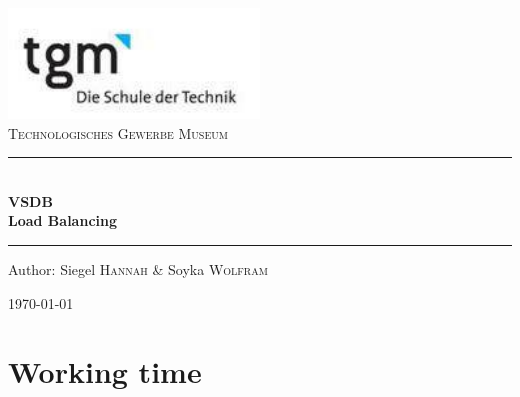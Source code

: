 \documentclass[12pt]{article}
\begin{document}
\begin{titlepage}
\begin{center}
\includegraphics[width=0.5\textwidth]{images/logo}\\[1cm]    

\textsc{\LARGE Technologisches Gewerbe Museum}\\[1.5cm]

\rule{1.0\textwidth}{1mm}
{ \huge \bfseries  \\\large VSDB \\ \huge Load Balancing \\[0.4cm] }

\rule{1.0\textwidth}{1mm}

\noindent 
\vspace{7cm}

\begin{center}
\large
Author: 
Siegel \textsc{Hannah} \&
Soyka \textsc{Wolfram}
\end{center}

\vfill

{\large \today}

\end{center}
\end{titlepage}

\tableofcontents


\ohead{\headmark}

\newpage



\section{Working time}
\end{document}
